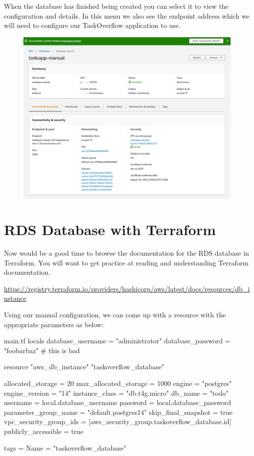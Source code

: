 \documentclass{csse4400}
\begin{document}
When the database has finished being created you can select it to view the configuration and details.
In this menu we also see the endpoint address which we will need to configure our TaskOverflow application to use.

\begin{figure}[H]
  \includegraphics[width=\textwidth]{images/aws_5}
\end{figure}

\section{RDS Database with Terraform}

Now would be a good time to browse the documentation for the RDS database in Terraform.
You will want to get practice at reading and understanding Terraform documentation.

\noindent \url{https://registry.terraform.io/providers/hashicorp/aws/latest/docs/resources/db_instance}

Using our manual configuration, we can come up with a resource with the appropriate parameters as below:

\begin{code}[language=terraform,numbers=none]{main.tf}
locals {
  database_username = "administrator"
  database_password = "foobarbaz" # this is bad
}

resource "aws_db_instance" "taskoverflow_database" {
  allocated_storage      = 20
  max_allocated_storage  = 1000
  engine                 = "postgres"
  engine_version         = "14"
  instance_class         = "db.t4g.micro"
  db_name                = "todo"
  username               = local.database_username
  password               = local.database_password
  parameter_group_name   = "default.postgres14"
  skip_final_snapshot    = true
  vpc_security_group_ids = [aws_security_group.taskoverflow_database.id]
  publicly_accessible    = true

  tags = {
    Name = "taskoverflow_database"
  }
}
\end{code}
\end{document}

